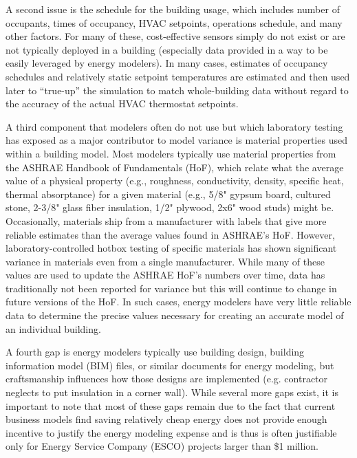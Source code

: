 \documentclass[preprint, review, 12pt]{elsarticle}
\begin{document}
A second issue is the schedule for the building usage, which includes number of occupants, times of occupancy, HVAC setpoints, operations schedule, and many other factors. For many of these, cost-effective sensors simply do not exist or are not typically deployed in a building (especially data provided in a way to be easily leveraged by energy modelers). In
many cases, estimates of occupancy schedules and relatively static setpoint temperatures are estimated and then used later to ``true-up'' the simulation to match whole-building data without regard to the accuracy of the actual HVAC thermostat setpoints.

A third component that modelers often do not use but which laboratory testing has exposed as a major contributor to model variance is material properties used within a building model. Most modelers typically use material properties from the ASHRAE Handbook of Fundamentals (HoF), which relate what the average value of a physical property (e.g., roughness, conductivity, density, specific heat, thermal absorptance) for a given material (e.g., 5/8" gypsum board, cultured stone, 2-3/8" glass fiber insulation, 1/2" plywood, 2x6" wood studs) might be. Occasionally, materials ship from a manufacturer with labels that give more reliable estimates than the average values found in ASHRAE's HoF. However, laboratory-controlled hotbox testing of specific materials has shown significant variance in materials even from a single manufacturer. While many of these values are used to update the ASHRAE HoF's numbers over time, data has traditionally not been reported for variance but this will continue to change in future versions of the HoF. In such cases, energy modelers have very little reliable data to determine the precise values necessary for creating an accurate model of an individual building.

A fourth gap is energy modelers typically use building design, building information model (BIM) files, or similar documents for energy modeling, but craftsmanship influences how those designs are implemented (e.g. contractor neglects to put insulation in a corner wall). While several more gaps exist, it is important to note that most of these gaps remain due to the fact that current business models find saving relatively cheap energy does not provide enough incentive to justify the energy modeling expense and is thus is often justifiable only for Energy Service Company (ESCO) projects larger than \$1
million.
\end{document}

